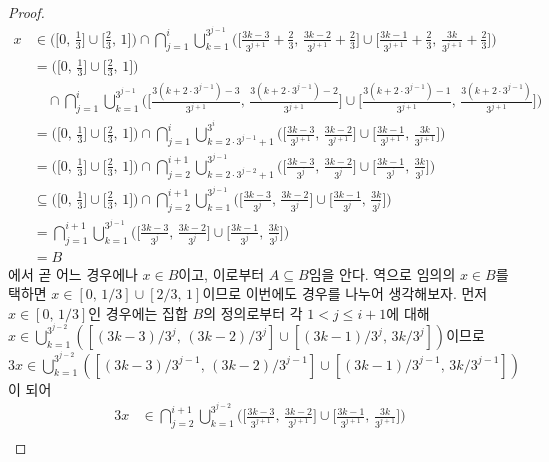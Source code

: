 \begin{proof}
    \begin{align*}
        x&\in\bigg(\bigg[0,\,\frac{1}{3}\bigg]\cup\bigg[\frac{2}{3},\,1\bigg]\bigg)\cap\bigcap_{j=1}^i\bigcup_{k=1}^{3^{j-1}}\bigg(\bigg[\frac{3k-3}{3^{j+1}}+\frac{2}{3},\,\frac{3k-2}{3^{j+1}}+\frac{2}{3}\bigg]\cup\bigg[\frac{3k-1}{3^{j+1}}+\frac{2}{3},\,\frac{3k}{3^{j+1}}+\frac{2}{3}\bigg]\bigg)\\
        &=\bigg(\bigg[0,\,\frac{1}{3}\bigg]\cup\bigg[\frac{2}{3},\,1\bigg]\bigg)\\
        &\quad\cap\bigcap_{j=1}^i\bigcup_{k=1}^{3^{j-1}}\bigg(\bigg[\frac{3(k+2\cdot3^{j-1})-3}{3^{j+1}},\,\frac{3(k+2\cdot3^{j-1})-2}{3^{j+1}}\bigg]\cup\bigg[\frac{3(k+2\cdot3^{j-1})-1}{3^{j+1}},\,\frac{3(k+2\cdot3^{j-1})}{3^{j+1}}\bigg]\bigg)\\
        &=\bigg(\bigg[0,\,\frac{1}{3}\bigg]\cup\bigg[\frac{2}{3},\,1\bigg]\bigg)\cap\bigcap_{j=1}^i\bigcup_{k=2\cdot3^{j-1}+1}^{3^i}\bigg(\bigg[\frac{3k-3}{3^{j+1}},\,\frac{3k-2}{3^{j+1}}\bigg]\cup\bigg[\frac{3k-1}{3^{j+1}},\,\frac{3k}{3^{j+1}}\bigg]\bigg)\\
        &=\bigg(\bigg[0,\,\frac{1}{3}\bigg]\cup\bigg[\frac{2}{3},\,1\bigg]\bigg)\cap\bigcap_{j=2}^{i+1}\bigcup_{k=2\cdot3^{j-2}+1}^{3^{j-1}}\bigg(\bigg[\frac{3k-3}{3^j},\,\frac{3k-2}{3^j}\bigg]\cup\bigg[\frac{3k-1}{3^j},\,\frac{3k}{3^j}\bigg]\bigg)\\
        &\subseteq\bigg(\bigg[0,\,\frac{1}{3}\bigg]\cup\bigg[\frac{2}{3},\,1\bigg]\bigg)\cap\bigcap_{j=2}^{i+1}\bigcup_{k=1}^{3^{j-1}}\bigg(\bigg[\frac{3k-3}{3^j},\,\frac{3k-2}{3^j}\bigg]\cup\bigg[\frac{3k-1}{3^j},\,\frac{3k}{3^j}\bigg]\bigg)\\
        &=\bigcap_{j=1}^{i+1}\bigcup_{k=1}^{3^{j-1}}\bigg(\bigg[\frac{3k-3}{3^j},\,\frac{3k-2}{3^j}\bigg]\cup\bigg[\frac{3k-1}{3^j},\,\frac{3k}{3^j}\bigg]\bigg)\\
        &=B
    \end{align*}
    에서 곧 어느 경우에나 $x\in B$이고, 이로부터 $A\subseteq B$임을 안다. 역으로 임의의 $x\in B$를 택하면 $x\in[0,\,1/3]\cup[2/3,\,1]$이므로 이번에도 경우를 나누어 생각해보자. 먼저 $x\in[0,\,1/3]$인 경우에는 집합 $B$의 정의로부터 각 $1<j\leq i+1$에 대해 $x\in\bigcup_{k=1}^{3^{j-2}}([(3k-3)/3^j,\,(3k-2)/3^j]\cup[(3k-1)/3^j,\,3k/3^j])$이므로 $3x\in\bigcup_{k=1}^{3^{j-2}}([(3k-3)/3^{j-1},\,(3k-2)/3^{j-1}]\cup[(3k-1)/3^{j-1},\,3k/3^{j-1}])$이 되어
    \begin{align*}
        3x&\in\bigcap_{j=2}^{i+1}\bigcup_{k=1}^{3^{j-2}}\bigg(\bigg[\frac{3k-3}{3^{j+1}},\,\frac{3k-2}{3^{j+1}}\bigg]\cup\bigg[\frac{3k-1}{3^{j+1}},\,\frac{3k}{3^{j+1}}\bigg]\bigg)\\

\end{align*}
\end{proof}
